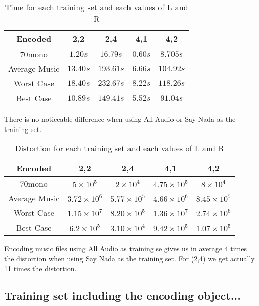 \documentclass[a4paper, 11pt]{article}
\begin{document}
			\begin{table}[H]
				\centering
				\begin{tabular}{c|c|c|c|c}
					\textbf{Encoded}	& \textbf{2,2} 	& \textbf{2,4}	& \textbf{4,1} & \textbf{4,2}\\ \hline
					70mono					& $ 1.20 s $ 	& $ 16.79 s $	& $ 0.60 s $ 	& $ 8.70 5 s $	\\ \hline
					Average Music			& $ 13.40 s $	& $ 193.61 s $	& $ 6.66 s $ 	& $ 104.92 s $	\\ \hline	
					Worst Case				& $ 18.40 s $	& $	232.67 s $	& $ 8.22 s $	& $	118.26 s $	\\ \hline
					Best Case				& $ 10.89 s $	& $	149.41 s $	& $ 5.52 s $	& $	91.04 s $	\\
				\end{tabular}
				\caption{Time for each training set and each values of L and R}
				\label{table:EncodeTime}
			\end{table}
			There is no noticeable difference when using All Audio or Say Nada as the training set.
			
			\begin{table}[H]
				\centering
				\begin{tabular}{c|c|c|c|c}
					\textbf{Encoded} & \textbf{2,2} 			& \textbf{2,4}			&  \textbf{4,1}				& \textbf{4,2} \\ \hline
					70mono			& $ 5 \times 10^{5} $ 		& $ 2 \times 10^{4} $	& $4.75 \times 10^{5} $ 	& $ 8 \times 10^{4} $ \\ \hline
					Average Music	& $ 3.72 \times 10^{6} $ 	& $ 5.77 \times 10^{5} $& $ 4.66 \times 10^{6} $  	& $ 8.45 \times 10^{5} $ \\ \hline	
					Worst Case 		& $ 1.15 \times 10^{7} $	& $	8.20 \times 10^{5} $& $ 1.36 \times 10^{7} $	& $ 2.74 \times 10^6 $ \\ \hline
					Best Case 		& $ 6.2 \times 10^{5} $		& $	3.10 \times 10^{4} $& $ 9.42 \times 10^{5} $ 	& $	1.07 \times 10^5 $ \\
				\end{tabular}
				\caption{Distortion for each training set and each values of L and R}
				\label{table:EncodeDist}
			\end{table}
		
			
			Encoding music files using All Audio as training se gives us in average 4 times the distortion when using Say Nada as the training set.
			For (2,4) we get actually 11 times the distortion.
			
		
		\subsection{Training set including the encoding object...}
			
\end{document}
